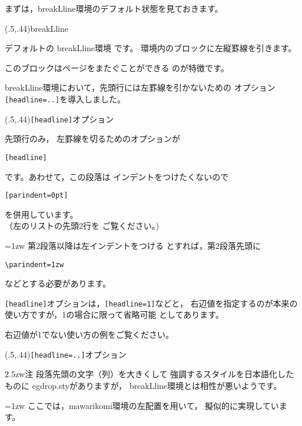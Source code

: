 \documentclass[a4j,fleqn]{jarticle}
\begin{document}
まずは，\textsf{breakLline}環境のデフォルト状態を見ておきます。

\begin{showEx}(.5,.44){\textsf{breakLline}}
\begin{breakLline}
デフォルトの
\textsf{breakLline}環境
です。
環境内のブロックに左縦罫線を引きます。

このブロックはページをまたぐことができる
のが特徴です。
\end{breakLline}
\smallskip
\end{showEx}

\textsf{breakLline}環境において，先頭行には左罫線を引かないための
オプション \verb+[headline=..]+を導入しました。

\begin{showEx}(.5,.44){\texttt{[headline]}オプション}
\begin{breakLline}%
    [parindent=0pt,headline]
先頭行のみ，
左罫線を切るためのオプションが
\begin{jquote}
\begin{verbatim}
[headline]
\end{verbatim}
\end{jquote}
です。あわせて，この段落は
インデントをつけたくないので
\begin{jquote}
\begin{verbatim}
[parindent=0pt]
\end{verbatim}
\end{jquote}
を併用しています。\\
（左のリストの先頭2行を
ご覧ください。)

\parindent=1zw\relax
第2段落以降は左インデントをつける
とすれば，第2段落先頭に
\begin{jquote}
\begin{verbatim}
\parindent=1zw
\end{verbatim}
\end{jquote}
などとする必要があります。
\end{breakLline}
\smallskip
\end{showEx}

\verb+[headline]+オプションは，\verb+[headline=1]+などと，
右辺値を指定するのが本来の使い方ですが，1の場合に限って省略可能
としてあります。

右辺値が1でない使い方の例をご覧ください。

\begin{showEx}(.5,.44){\texttt{[headline=..]}オプション}
\begin{breakLline}%
    [parindent=0pt,headline=2]
\begin{mawarikomi}[l]%
    {2.5zw}{\Huge 注}
段落先頭の文字（列）を大きくして
強調するスタイルを日本語化したものに
\textsf{egdrop.sty}がありますが，
\textsf{breakLline}環境とは相性が悪いようです。
\end{mawarikomi}

\parindent=1zw\relax
ここでは，\textsf{mawarikomi}環境の左配置を用いて，
擬似的に実現しています。
\end{breakLline}
\smallskip
\end{showEx}
\end{document}
